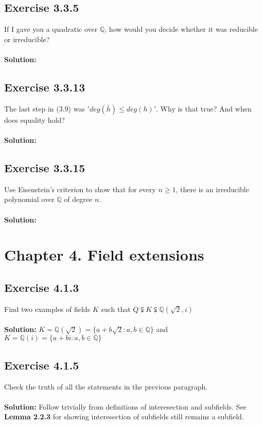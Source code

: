 \documentclass{article}
\begin{document}
\subsection*{Exercise 3.3.5}
If I gave you a quadratic over $\mathbb{Q}$, how would you decide
whether it was reducible or irreducible?
\\\\
\textbf{Solution:}

\subsection*{Exercise 3.3.13}
The last step in (3.9) was $'deg(\bar h) \leq deg(h)'$. Why
is that true? And when does equality hold?
\\\\
\textbf{Solution:}

\subsection*{Exercise 3.3.15}
Use Eisenstein's criterion to show that for every
$n \ge 1$, there is an irreducible polynomial over $\mathbb{Q}$ of degree $n$.
\\\\
\textbf{Solution:}

\section*{Chapter 4. Field extensions}

\subsection*{Exercise 4.1.3}
Find two examples of fields $K$ such that $Q \subsetneqq K \subsetneqq \mathbb{Q}(\sqrt2, i)$ 
\\\\
\textbf{Solution:} $K=\mathbb{Q}(\sqrt2) = \{a+b\sqrt2: a,b \in \mathbb{Q}\}$ and \\ $K=\mathbb{Q}(i)= \{a+bi: a,b \in \mathbb{Q}\}$

\subsection*{Exercise 4.1.5}
Check the truth of all the statements in the previous paragraph.
\\\\
\textbf{Solution:} Follow trivially from definitions of interesection and subfields. See \textbf{Lemma 2.2.3} for showing interesection of subfields still remains a subfield.
\end{document}
